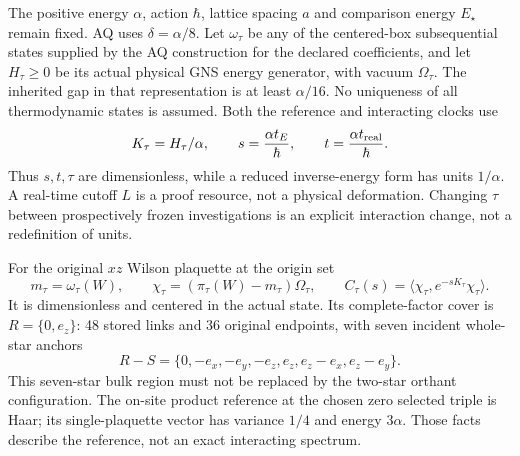 The positive energy $\alpha$, action $\hbar$, lattice spacing $a$ and comparison
energy $E_\star$ remain fixed. AQ uses $\delta=\alpha/8$. Let $\omega_\tau$ be
any of the centered-box subsequential states supplied by the AQ construction
for the declared coefficients, and let $H_\tau\ge0$ be its actual physical GNS
energy generator, with vacuum $\Omega_\tau$. The inherited gap in that
representation is at least $\alpha/16$. No uniqueness of all thermodynamic
states is assumed. Both the reference and interacting clocks use
\begin{equation}
 K_\tau=H_\tau/\alpha,\qquad
 s=\frac{\alpha t_E}{\hbar},\qquad
 t=\frac{\alpha t_{\rm real}}{\hbar}.
 \label{eq:clock}
\end{equation}
Thus $s,t,\tau$ are dimensionless, while a reduced inverse-energy form has
units $1/\alpha$. A real-time cutoff $L$ is a proof resource, not a physical
deformation. Changing $\tau$ between prospectively frozen investigations is an
explicit interaction change, not a redefinition of units.

For the original $xz$ Wilson plaquette at the origin set
\begin{equation}
 m_\tau=\omega_\tau(W),\qquad
 \chi_\tau=(\pi_\tau(W)-m_\tau)\Omega_\tau,\qquad
 C_\tau(s)=\langle\chi_\tau,e^{-sK_\tau}\chi_\tau\rangle.
 \label{eq:observable}
\end{equation}
It is dimensionless and centered in the actual state. Its complete-factor cover
is $R=\{0,e_z\}$: 48 stored links and 36 original endpoints, with seven incident
whole-star anchors
\begin{equation}
 R-S=\{0,-e_x,-e_y,-e_z,e_z,e_z-e_x,e_z-e_y\}.
 \label{eq:seven}
\end{equation}
This seven-star bulk region must not be replaced by the two-star orthant
configuration. The on-site product reference at the chosen zero selected triple
is Haar; its single-plaquette vector has variance $1/4$ and energy $3\alpha$.
Those facts describe the reference, not an exact interacting spectrum.
